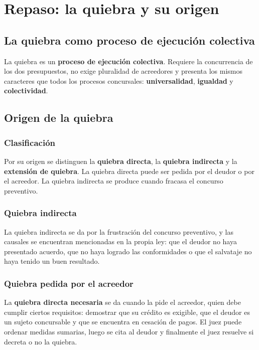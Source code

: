 \documentclass[12pt,oneside]{book}
\begin{document}
\chapter[La quiebra y su origen]{Repaso: la quiebra y su origen}

\section{La quiebra como proceso de ejecución colectiva}

La quiebra es un \textbf{proceso de ejecución colectiva}. Requiere la concurrencia de los dos presupuestos, no exige pluralidad de acreedores y presenta los mismos caracteres que todos los procesos concursales: \textbf{universalidad}, \textbf{igualdad} y \textbf{colectividad}.

\section{Origen de la quiebra}

\subsection{Clasificación}

Por su origen se distinguen la \textbf{quiebra directa}, la \textbf{quiebra indirecta} y la \textbf{extensión de quiebra}. La quiebra directa puede ser pedida por el deudor o por el acreedor. La quiebra indirecta se produce cuando fracasa el concurso preventivo.

\subsection{Quiebra indirecta}

La quiebra indirecta se da por la frustración del concurso preventivo, y las causales se encuentran mencionadas en la propia ley: que el deudor no haya presentado acuerdo, que no haya logrado las conformidades o que el salvataje no haya tenido un buen resultado.

\subsection{Quiebra pedida por el acreedor}

La \textbf{quiebra directa necesaria} se da cuando la pide el acreedor, quien debe cumplir ciertos requisitos: demostrar que su crédito es exigible, que el deudor es un sujeto concursable y que se encuentra en cesación de pagos. El juez puede ordenar medidas sumarias, luego se cita al deudor y finalmente el juez resuelve si decreta o no la quiebra.
\end{document}
